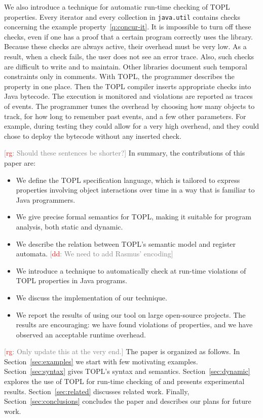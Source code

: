 \documentclass{sigplanconf}[10pt] %
\newcommand{\noterg}[2]{\textcolor{gray}{[\textcolor{red}{#1}: #2]}}
\newcommand{\rg}[1]{\noterg{rg}{#1}}
\newcommand{\dd}[1]{\noterg{dd}{#1}}
\begin{document}
We also introduce a technique for automatic run-time checking of TOPL properties.
Every iterator and every collection in \texttt{java.util} contains checks concerning the example property~\eqref{q:concur-it}.
It is impossible to turn off these checks, even if one has a proof that a certain program correctly uses the library.
Because these checks are always active, their overhead must be very low.
As a result, when a check fails, the user does not see an error trace.
Also, such checks are difficult to write and to maintain.
Other libraries document such temporal constraints only in comments.
With TOPL, the programmer describes the property in one place.
Then the TOPL compiler inserts appropriate checks into Java bytecode.
The execution is monitored and violations are reported as traces of events.
The programmer tunes the overhead by choosing how many objects to track, for how long to remember past events, and a few other parameters.
For example, during testing they could allow for a very high overhead, and they could chose to deploy the bytecode without any inserted check.

\rg{Should these sentences be shorter?}
In summary, the contributions of this paper are:
\begin{itemize}
\item We define the TOPL specification language, which is tailored to express properties involving object interactions over time in a way that is familiar to Java programmers.
\item We give precise formal semantics for TOPL, making it suitable for program analysis, both static and dynamic.
\item We describe the relation between TOPL's semantic model and register automata. \dd{We need to add Rasmus' encoding}
\item We introduce a technique to automatically check at run-time violations of TOPL properties in Java programs.

\item We discuss the implementation of our technique.
\item We report the results of using our tool on large open-source projects. The results are encouraging: we have found
violations of properties, and we have observed an acceptable runtime overhead. 
\end{itemize}

\rg{Only update this at the very end.}
The paper is organized as follows.
In Section~\ref{sec:examples} we start with few motivating examples.
Section~\ref{sec:syntax} gives  TOPL's syntax  and semantics.
Section~\ref{sec:dynamic} explores the use of TOPL for run-time checking of and presents experimental results.
Section~\ref{sec:related} discusses related work.
Finally, Section~\ref{sec:conclusions} concludes the paper and describes our plans for future work.
\end{document}
